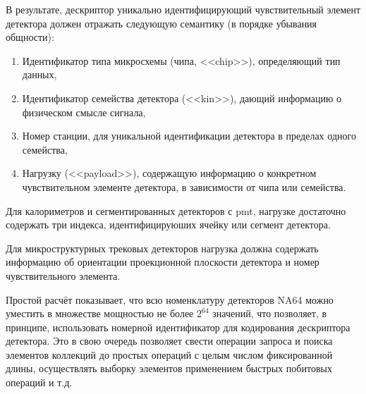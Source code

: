 В результате, дескриптор уникально идентифицирующий чувствительный
элемент детектора должен отражать следующую семантику (в порядке
убывания общности):

\begin{enumerate}
    \item Идентификатор типа микросхемы (чипа, <<chip>>), определяющий
    тип данных,
    \item Идентификатор семейства детектора (<<kin>>), дающий информацию о
    физическом смысле сигнала,
    \item Номер станции, для уникальной идентификации детектора в
    пределах одного семейства,
    \item Нагрузку (<<payload>>), содержащую информацию о конкретном
    чувствительном элементе детектора, в зависимости от чипа или семейства.
\end{enumerate}

Для калориметров и сегментированных детекторов с \acrshort{pmt},
нагрузке достаточно содержать три индекса, идентифицируюших
ячейку или сегмент детектора.

Для микроструктурных трековых детекторов нагрузка должна содержать
информацию об ориентации проекционной плоскости детектора и номер
чувствительного элемента.

Простой расчёт показывает, что всю номенклатуру детекторов NA64
можно уместить в множестве мощностью не более $2^{64}$ значений,
что позволяет, в принципе, использовать номерной идентификатор
для кодирования дескриптора детектора. Это в свою очередь позволяет свести
операции запроса и поиска элементов коллекций до простых
операций с целым числом фиксированной длины, осуществлять выборку
элементов применением быстрых побитовых операций и т.д.


